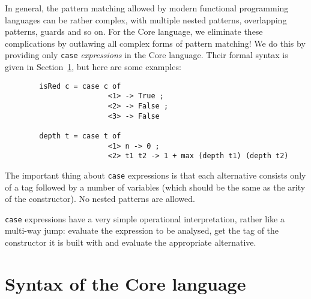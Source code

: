 In general, the pattern matching allowed by modern functional programming
languages can be rather complex, with multiple nested patterns,
overlapping patterns, guards and so on.
For the Core language, we eliminate these complications by
outlawing all complex forms of pattern matching!  We do this by providing
only \mbox{\tt case} {\em expressions\/} in the Core language.
Their formal syntax is given in Section~\ref{sect:syntax}, but here are some
examples:
\begin{verbatim}
        isRed c = case c of
                        <1> -> True ;
                        <2> -> False ;
                        <3> -> False

        depth t = case t of
                        <1> n -> 0 ;
                        <2> t1 t2 -> 1 + max (depth t1) (depth t2)
\end{verbatim}
The important thing about \mbox{\tt case} expressions is that each
alternative
consists only of a tag followed by a number of variables (which should be
the same as the arity of the constructor).
No nested patterns are allowed.

\mbox{\tt case} expressions have a very simple operational interpretation, rather like
a multi-way jump: evaluate the expression to be analysed, get the tag of
the constructor it is built with and evaluate the appropriate alternative.

\section{Syntax of the Core language}
\label{sect:syntax}

